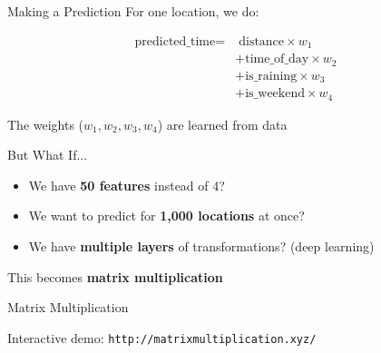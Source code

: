 \documentclass[10pt]{beamer}
\begin{document}
\begin{frame}{Making a Prediction}
  For one location, we do:
  
  \vspace{1em}
  \begin{align*}
    \text{predicted\_time} = &\; \text{distance} \times w_1 \\
    &+ \text{time\_of\_day} \times w_2 \\
    &+ \text{is\_raining} \times w_3 \\
    &+ \text{is\_weekend} \times w_4
  \end{align*}
  
  \vspace{1em}
  \small The weights ($w_1, w_2, w_3, w_4$) are learned from data
\end{frame}

\begin{frame}{But What If...}
  \begin{itemize}
    \item We have \textbf{50 features} instead of 4?
    \item We want to predict for \textbf{1,000 locations} at once?
    \item We have \textbf{multiple layers} of transformations? (deep learning)
  \end{itemize}
  
  \vspace{2em}
  \centering
  \Large This becomes \textbf{matrix multiplication}
\end{frame}

\begin{frame}{Matrix Multiplication}
  \begin{center}
  \end{center}
  
  \vspace{0.5em}
  \centering
  \small Interactive demo: \texttt{http://matrixmultiplication.xyz/}
\end{frame}
\end{document}
